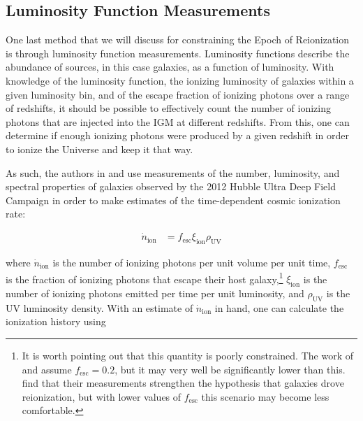 % 


\subsection{Luminosity Function Measurements}

One last method that we will discuss for constraining the Epoch of Reionization is through luminosity function measurements. Luminosity functions describe the abundance of sources, in this case galaxies, as a function of luminosity. With knowledge of the luminosity function, the ionizing luminosity of galaxies within a given luminosity bin, and of the escape fraction of ionizing photons over a range of redshifts, it should be possible to effectively count the number of ionizing photons that are injected into the IGM at different redshifts. From this, one can determine if enough ionizing photons were produced by a given redshift in order to ionize the Universe and keep it that way. 


As such, the authors in \cite{Robertson2013} and \cite{robertson2015cosmic} use measurements of the number, luminosity, and spectral properties of galaxies observed by the 2012 Hubble Ultra Deep Field Campaign in order to make estimates of the time-dependent cosmic ionization rate:

\begin{align}
\dot{n}_{\text{ion}} &= f_{\text{esc}} \xi_{\text{ion}} \rho_{\text{UV}}
\end{align}

where $\dot{n}_{\text{ion}}$ is the number of ionizing photons per unit volume per unit time, $f_{\text{esc}}$ is the fraction of ionizing photons that escape their host galaxy,\footnote{It is worth pointing out that this quantity is poorly constrained. The work of \cite{Robertson2013} and \cite{robertson2015cosmic} assume $f_{\text{esc}} = 0.2$, but it may very well be significantly lower than this. \cite{robertson2015cosmic} find that their measurements strengthen the hypothesis that galaxies drove reionization, but with lower values of $f_{\text{esc}}$ this scenario may become less comfortable.} $\xi_{\text{ion}}$ is the number of ionizing photons emitted per time per unit luminosity, and $\rho_{\text{UV}}$ is the UV luminosity density. With an estimate of $\dot{n}_{\text{ion}}$ in hand, one can calculate the ionization history using

